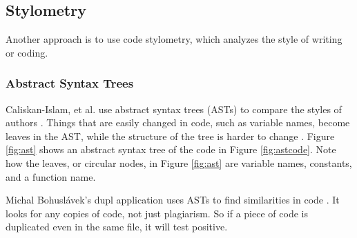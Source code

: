 \documentclass[10pt,journal,compsoc]{IEEEtran}
\begin{document}
		\subsection{Stylometry}
		Another approach is to use code stylometry, which analyzes the style of writing or coding.
		
			\subsubsection{Abstract Syntax Trees}
			Caliskan-Islam, et al. use abstract syntax trees (ASTs) to compare the styles of authors \cite{caliskan-islam+harang+liu}. Things that are easily changed in code, such as variable names, become leaves in the AST, while the structure of the tree is harder to change \cite{caliskan-islam+harang+liu}. Figure \ref{fig:ast} shows an abstract syntax tree of the code in Figure \ref{fig:astcode}. Note how the leaves, or circular nodes, in Figure \ref{fig:ast} are variable names, constants, and a function name.
		
			Michal Bohuslávek's dupl application uses ASTs to find similarities in code \cite{bohuslave}. It looks for any copies of code, not just plagiarism. So if a piece of code is duplicated even in the same file, it will test positive.
		
\end{document}
